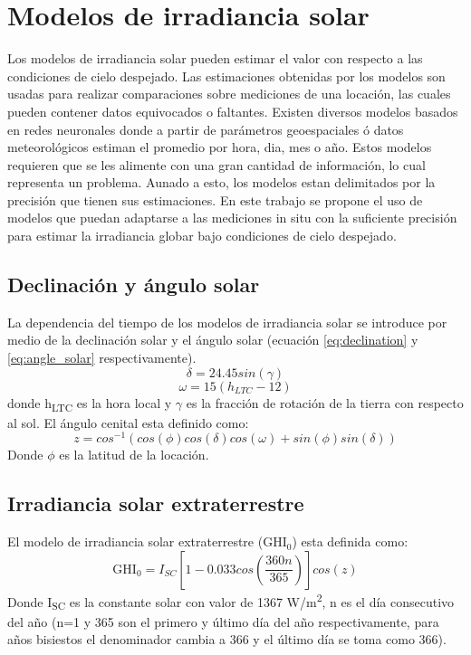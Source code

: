\section{Modelos de irradiancia solar}
Los modelos de irradiancia solar pueden estimar el valor con respecto a las condiciones de cielo despejado\cite{Gueymard_2012,Perez_Burgos_2017,Ineichen_2016}. Las estimaciones obtenidas por los modelos son usadas para realizar comparaciones sobre mediciones de una locación, las cuales pueden contener datos equivocados o faltantes. Existen diversos modelos basados en redes neuronales donde a partir de parámetros geoespaciales ó datos meteorológicos estiman el promedio por hora, dia, mes o año\cite{Hasni_2012,Kumar_2019,Ozgoren_2012,Sahan_2016}. Estos modelos requieren que se les alimente con una gran cantidad de información, lo cual representa un problema. Aunado a esto, los modelos estan delimitados por la precisión que tienen sus estimaciones\cite{Ruiz_Arias_2018}. En este trabajo se propone el uso de modelos que puedan adaptarse a las mediciones in situ con la suficiente precisión para estimar la irradiancia globar bajo condiciones de cielo despejado.
\subsection{Declinación y ángulo solar}
La dependencia del tiempo de los modelos de irradiancia solar se introduce por medio de la declinación solar y el ángulo solar (ecuación \ref{eq:declination}  y \ref{eq:angle_solar} respectivamente).
\begin{equation}
	\delta = 24.45 sin(\gamma)
	\label{eq:declination}
\end{equation}
\begin{equation}
	\omega = 15(h_{LTC}-12)
	\label{eq:angle_solar}
\end{equation}
donde h\textsubscript{LTC} es la hora local y $\gamma$ es la fracción de rotación de la tierra con respecto al sol. El ángulo cenital esta definido como:
\begin{equation*}
	z = cos^{-1}(cos(\phi)cos(\delta)cos(\omega)+sin(\phi)sin(\delta))
\end{equation*}
Donde $\phi$ es la latitud de la locación.
\subsection{Irradiancia solar extraterrestre}
El modelo de irradiancia solar extraterrestre (GHI$_0$) esta definida como\cite{Muhammad_1983}:
\begin{equation}
	\text{GHI}_0 = I_{SC}\left[ 1-0.033 cos\left( \frac{360n}{365}  \right)\right] cos(z)  \label{eq:GHI0}
\end{equation}
Donde I\textsubscript{SC} es la constante solar con valor de 1367 W/m\textsuperscript{2}, n es el día consecutivo del año (n=1 y 365 son el primero y último día del año respectivamente, para años bisiestos el denominador cambia a 366 y el último día se toma como 366).
